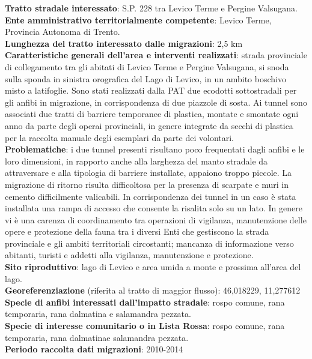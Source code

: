 \documentclass[11pt,a4paper,twoside]{memoir}
\begin{document}
\textbf{Tratto stradale interessato}: S.P. 228 tra Levico Terme e Pergine Valsugana. \\
\textbf{Ente amministrativo territorialmente competente}: Levico Terme, Provincia Autonoma di Trento. \\
\textbf{Lunghezza del tratto interessato dalle migrazioni}: 2,5 km \\
\textbf{Caratteristiche generali dell’area e interventi realizzati}: strada provinciale di collegamento tra gli abitati di Levico Terme e Pergine Valsugana, si snoda sulla sponda in sinistra orografica del Lago di Levico, in un ambito boschivo misto a latifoglie. Sono stati realizzati dalla PAT due ecodotti sottostradali per gli anfibi in migrazione, in corrispondenza di due piazzole di sosta. Ai tunnel sono associati due tratti di barriere temporanee di plastica, montate e smontate ogni anno da parte degli operai provinciali, in genere integrate da secchi di plastica per la raccolta manuale degli esemplari da parte dei volontari. \\
\textbf{Problematiche}: i due tunnel presenti risultano poco frequentati dagli anfibi e le loro dimensioni, in rapporto anche alla larghezza del manto stradale da attraversare e alla tipologia di barriere installate, appaiono troppo piccole. La migrazione di ritorno risulta difficoltosa per la presenza di scarpate e muri in cemento difficilmente valicabili. In corrispondenza dei tunnel in un caso è stata installata una rampa di accesso che consente la risalita solo su un lato. In genere vi è una carenza di coordinamento tra operazioni di vigilanza, manutenzione delle opere e protezione della fauna tra i diversi Enti che gestiscono la strada provinciale e gli ambiti territoriali circostanti; mancanza di informazione verso abitanti, turisti e addetti alla vigilanza, manutenzione e protezione. \\
\textbf{Sito riproduttivo}: lago di Levico e area umida a monte e prossima all’area del lago. \\
\textbf{Georeferenziazione} (riferita al tratto di maggior flusso): 46,018229, 11,277612 \\
\textbf{Specie di anfibi interessati dall’impatto stradale}: rospo comune, rana temporaria, rana dalmatina e salamandra pezzata. \\
\textbf{Specie di interesse comunitario o in Lista Rossa}: rospo comune, rana temporaria, rana dalmatinae salamandra pezzata. \\
\textbf{Periodo raccolta dati migrazioni}: 2010-2014 \\
\end{document}
